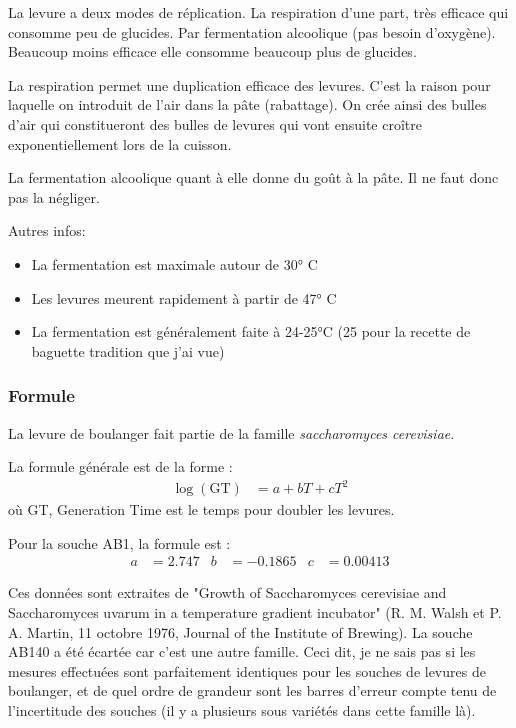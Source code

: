 \documentclass[a4paper,twoside,openright]{report}
\begin{document}
La levure a deux modes de réplication. La respiration d'une part, très efficace qui consomme peu de glucides. Par fermentation 
alcoolique (pas besoin d'oxygène). Beaucoup moins efficace elle consomme beaucoup plus de glucides. 

La respiration permet une 
duplication efficace des levures. C'est la raison pour laquelle on introduit de l'air dans la pâte (rabattage). On crée ainsi 
des bulles d'air qui constitueront des bulles de levures qui vont ensuite croître exponentiellement lors de la cuisson. 

La fermentation alcoolique quant à elle donne du goût à la pâte. Il ne faut donc pas la négliger. 

Autres infos:
\begin{itemize}
\item La fermentation est maximale autour de 30° C
\item Les levures meurent rapidement à partir de 47° C
\item La fermentation est généralement faite à 24-25°C (25 pour la recette de baguette tradition que j'ai vue)
\end{itemize}


\subsubsection{Formule}
La levure de boulanger fait partie de la famille \emph{saccharomyces cerevisiae}.

La formule générale est de la forme :
\begin{align}
\log(\mathrm{GT}) &= a + bT + cT^2
\end{align}
où GT, Generation Time est le temps pour doubler les levures.

Pour la souche AB1, la formule est :
\begin{align}
a&= 2.747 & b&= -0.1865 & c&= 0.00413
\end{align}

Ces données sont extraites de "Growth of Saccharomyces cerevisiae and Saccharomyces uvarum in a temperature gradient incubator" (R. M. Walsh et P. A. Martin, 11 octobre 1976, Journal of the Institute of Brewing). La souche AB140 a été écartée car c'est une autre famille. Ceci dit, je ne sais pas si les mesures effectuées sont parfaitement identiques pour les souches de levures de boulanger, et de quel ordre de grandeur sont les barres d'erreur compte tenu de l'incertitude des souches (il y a plusieurs sous variétés dans cette famille là).
\end{document}

